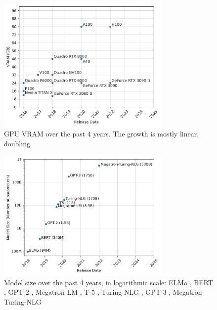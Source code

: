 \begin{figure}[h]
    \centering
    \caption{GPU VRAM over the past 4 years. The growth is mostly linear, doubling }
    \label{fig:gpu-vram-over-time}
    \includegraphics[width=0.75\textwidth]{./figures/gpu-vram-over-time.pdf}
\end{figure}

\begin{figure}[h]
    \centering
    \caption{Model size over the past 4 years, in logarithmic scale: ELMo \cite{peters2018elmo}, BERT \cite{devlin2018bert}, GPT-2 \cite{radford2019language}, Megatron-LM \cite{shoeybi2019megatronlm}, T-5 \cite{raffael2019t5}, Turing-NLG \cite{microsoft2020turingnlg}, GPT-3 \cite{brown2020gpt3}, Megatron-Turing-NLG \cite{smith2022megatronturingnlg}}
    \label{fig:model-size-over-time}
    \includegraphics[width=0.75\textwidth]{./figures/model-size-over-time.pdf}
\end{figure}

